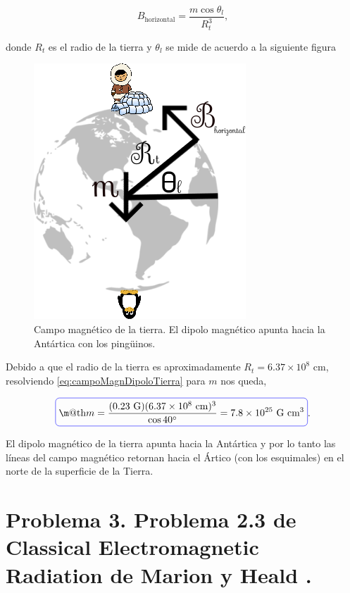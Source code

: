 \documentclass[a4paper,11pt]{article}
\makeatletter
\numberwithin{equation}{section}
\newcommand*{\boxcolor}{blue}
\renewcommand{\boxed}[1]{\textcolor{\boxcolor}{%
\tikz[baseline={([yshift=-1ex]current bounding box.center)}] \node [rectangle, minimum width=1ex,rounded corners,draw] {\normalcolor\m@th$\displaystyle#1$};}}
\makeatother
\begin{document}
\begin{equation}
 B_{\text{horizontal}} = \frac{m\cos{\theta_l}}{R_t^3},
 \label{eq:campoMagnDipoloTierra}
\end{equation}

  donde $R_t$ es el radio de la tierra y  $\theta_l$ se mide de acuerdo a la siguiente 
figura 


\begin{figure}[H]
 \center 
 \includegraphics[scale=0.5]{problema2fig1}
 \caption{Campo magnético de la tierra. El dipolo magnético apunta 
 hacia la Antártica con los pingüinos.}
 \label{fig:problema2fig1}
\end{figure}

Debido a que el radio de la tierra es aproximadamente $R_t = 6.37 \times 10^8$ cm, 
resolviendo \eqref{eq:campoMagnDipoloTierra} para $m$ nos queda, 

\begin{equation}
 \boxed{m = \frac{(0.23 \text{ G})(6.37 \times 10^8 \text{ cm})^3}{\cos{40^\circ}} = 
 7.8 \times 10^{25} \text{ G}\text{ cm}^3}.
\end{equation}

El dipolo magnético de la tierra apunta hacia la Antártica y por lo tanto las líneas 
del campo magnético retornan hacia el Ártico (con los esquimales) en el norte de la 
superficie de la Tierra.

\section{Problema 3. Problema 2.3 de Classical Electromagnetic Radiation
de Marion y Heald \cite{marion2}.}
\end{document}
